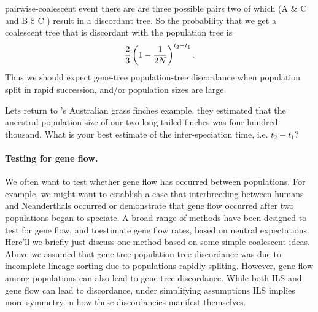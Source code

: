 pairwise-coalescent event there are are three possible pairs two of
which (A \& C  and B \$ C ) result in a discordant tree. So the
probability that we get a coalescent tree that is discordant with the
population tree is
\begin{equation}
\frac{2}{3} \left(1 - \nicefrac{1}{2N}\right)^{t_2-t_1}.
\end{equation}
Thus we should expect gene-tree population-tree discordance when
population split in rapid succession, and/or population sizes are
large. 
\begin{question}
Lets return to \citeauthor{jennings:05}'s Australian grass finches
example, they estimated that the ancestral population size of our two
long-tailed finches was four hundred thousand. What is your best
estimate of the inter-speciation time, i.e. $t_2-t_1$? 
\end{question}

\paragraph{Testing for gene flow.} 

We often want to test whether gene flow has occurred between populations. For example, we might want to establish a case
that interbreeding between humans and Neanderthals occurred or demonstrate that
gene flow occurred after two populations began to speciate. 
A broad range of methods have been designed to test for gene flow, and
toestimate gene flow rates, based on neutral expectations. Here'll we
briefly just discuss one method based on
some simple coalescent ideas.  Above we assumed that gene-tree population-tree discordance was due to
incomplete lineage sorting due to populations rapidly
spliting. However, gene flow among populations can also lead to gene-tree discordance.
While both ILS and gene flow can lead to discordance, under
simplifying assumptions ILS implies more symmetry in how these
discordancies manifest themselves.\\


